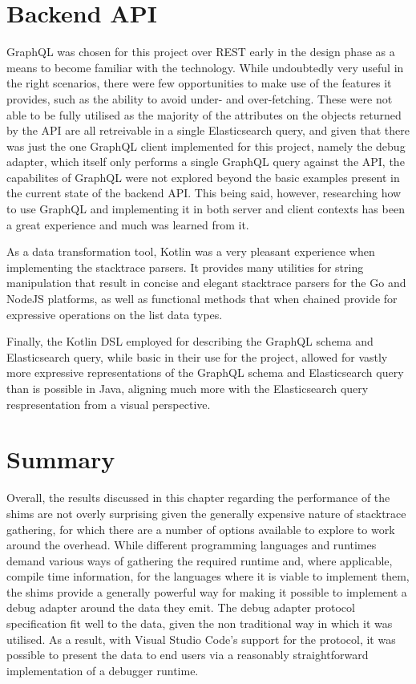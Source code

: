 \documentclass[12pt,pdftex,titlepage]{report}
\begin{document}
        \newpage
        \section{Backend API}
            GraphQL was chosen for this project over REST early in the design phase as a means to become familiar with the technology. While undoubtedly very useful in the right scenarios, there were few opportunities to make 
            use of the features it provides, such as the ability to avoid under- and over-fetching. These were not able to be fully utilised as the majority of the attributes on the objects returned by the API are all retreivable in 
            a single Elasticsearch query, and given that there was just the one GraphQL client implemented for this project, namely the debug adapter, which itself only performs a single GraphQL query against the API, the capabilites 
            of GraphQL were not explored beyond the basic examples present in the current state of the backend API. This being said, however, researching how to use GraphQL and implementing it in both server and client contexts has 
            been a great experience and much was learned from it.

            As a data transformation tool, Kotlin was a very pleasant experience when implementing the stacktrace parsers. It provides many utilities for string manipulation that result in concise and elegant stacktrace parsers
            for the Go and NodeJS platforms, as well as functional methods that when chained provide for expressive operations on the list data types.

            Finally, the Kotlin DSL employed for describing the GraphQL schema and Elasticsearch query, while basic in their use for the project, allowed for vastly more expressive representations of the GraphQL schema and Elasticsearch
            query than is possible in Java, aligning much more with the Elasticsearch query respresentation from a visual perspective.

        \section{Summary}
            Overall, the results discussed in this chapter regarding the performance of the shims are not overly surprising given the generally expensive nature of stacktrace gathering, for which there are a number of options available 
            to explore to work around the overhead. While different programming languages and runtimes demand various ways of gathering the required runtime and, where applicable, compile time information, for the languages where it is viable to 
            implement them, the shims provide a generally powerful way for making it possible to implement a debug adapter around the data they emit. The debug adapter protocol specification fit well to the data, given the non traditional 
            way in which it was utilised. As a result, with Visual Studio Code's support for the protocol, it was possible to present the data to end users via a reasonably straightforward implementation of a debugger runtime.
\end{document}
